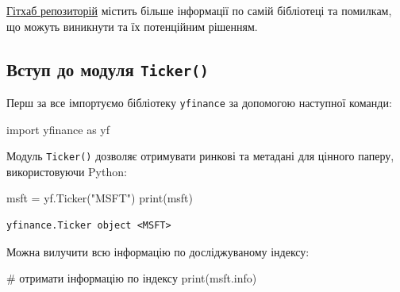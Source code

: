 \documentclass[
  letterpaper,
]{report}
\newenvironment{Shaded}{\begin{snugshade}}{\end{snugshade}}
\newcommand{\BuiltInTok}[1]{\textcolor[rgb]{0.00,0.23,0.31}{#1}}
\newcommand{\CommentTok}[1]{\textcolor[rgb]{0.37,0.37,0.37}{#1}}
\newcommand{\ImportTok}[1]{\textcolor[rgb]{0.00,0.46,0.62}{#1}}
\newcommand{\NormalTok}[1]{\textcolor[rgb]{0.00,0.23,0.31}{#1}}
\newcommand{\OperatorTok}[1]{\textcolor[rgb]{0.37,0.37,0.37}{#1}}
\newcommand{\StringTok}[1]{\textcolor[rgb]{0.13,0.47,0.30}{#1}}
\begin{document}
\href{https://github.com/ranaroussi/yfinance}{Гітхаб репозиторій}
містить більше інформації по самій бібліотеці та помилкам, що можуть
виникнути та їх потенційним рішенням.

\hypertarget{ux432ux441ux442ux443ux43f-ux434ux43e-ux43cux43eux434ux443ux43bux44f-ticker}{%
\subsection{\texorpdfstring{Вступ до модуля
\texttt{Ticker()}}{Вступ до модуля Ticker()}}\label{ux432ux441ux442ux443ux43f-ux434ux43e-ux43cux43eux434ux443ux43bux44f-ticker}}

Перш за все імпортуємо бібліотеку \texttt{yfinance} за допомогою
наступної команди:

\begin{Shaded}
\begin{Highlighting}[]
\ImportTok{import}\NormalTok{ yfinance }\ImportTok{as}\NormalTok{ yf}
\end{Highlighting}
\end{Shaded}

Модуль \texttt{Ticker()} дозволяє отримувати ринкові та метадані для
цінного паперу, використовуючи Python:

\begin{Shaded}
\begin{Highlighting}[]
\NormalTok{msft }\OperatorTok{=}\NormalTok{ yf.Ticker(}\StringTok{"MSFT"}\NormalTok{)}
\BuiltInTok{print}\NormalTok{(msft)}
\end{Highlighting}
\end{Shaded}

\begin{verbatim}
yfinance.Ticker object <MSFT>
\end{verbatim}

Можна вилучити всю інформацію по досліджуваному індексу:

\begin{Shaded}
\begin{Highlighting}[]
\CommentTok{\# отримати інформацію по індексу}
\BuiltInTok{print}\NormalTok{(msft.info)}
\end{Highlighting}
\end{Shaded}
\end{document}
